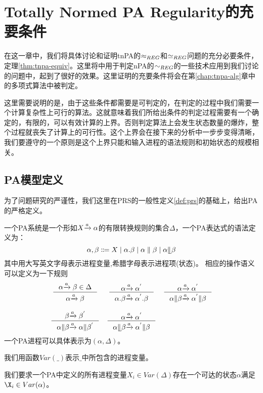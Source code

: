 \chapter{Totally Normed PA Regularity的充要条件}
\label{chap:tnpa-equiv}

在这一章中，我们将具体讨论和证明tnPA的$\approx_{REG}$和$\simeq_{REG}$问题的充分必要条件，定理\ref{thm:tnpa-equiv}。这里将\cite{Kucera1996}中用于判定nPA的$\sim_{REG}$的一些技术应用到我们讨论的问题中，起到了很好的效果。这里证明的充要条件将会在第\ref{chap:tnpa-alg}章中的多项式算法中被判定。

这里需要说明的是，由于这些条件都需要是可判定的，在判定的过程中我们需要一个计算复杂性上可行的算法。这就意味着我们所给出条件的判定过程需要有一个确定的，有限的，可以有效计算的上界。否则判定算法上会发生状态数量的爆炸，整个过程就丧失了计算上的可行性。这个上界会在接下来的分析中一步步变得清晰，我们要遵守的一个原则是这个上界只能和输入进程的语法规则和初始状态的规模相关。

\section{PA模型定义}
\label{sec:pa-def}

为了问题研究的严谨性，我们这里在PRS的一般性定义\ref{def:prs}的基础上，给出PA的严格定义。

\begin{defn}[PA 定义]\label{def:pa}
一个PA系统是一个形如$X{\xrightarrow{a}{}}\alpha$的有限转换规则的集合$\Delta$，一个PA表达式的语法定义为：
$$\alpha,\beta\Coloneqq X\mid \alpha.\beta\mid\alpha\parallel\beta\mid\alpha\llfloor\beta$$
其中用大写英文字母表示进程变量,希腊字母表示进程项(状态)。
相应的操作语义可以定义为一下规则
\[\begin{array}{ccc}
$\inference{\alpha\act{a}\beta\in\Delta}{\alpha\act{a}\beta}$ &
$\inference{\alpha\act{a}\alpha^{'}}{\alpha.\beta\act{a}\alpha^{'}.\beta}$ &
$\inference{\alpha\act{a}\alpha^{'}}{\alpha\| \beta\act{a}\alpha^{'}\|\beta}$ \\
 \\
$\inference{\beta\act{a}\beta^{'}}{\alpha\| \beta\act{a}\alpha \| \beta^{'}}$ &
$\inference{\alpha\act{a}\alpha^{'}}{\alpha\llfloor \beta\act{a}\alpha^{'}\|\beta}$ &
\end{array}\]
一个PA进程可以具体表示为$(\alpha,\Delta)$。
\end{defn}

我们用函数$Var(\_)$表示$\_$中所包含的进程变量。

我们要求一个PA中定义的所有进程变量$X_i\in Var(\Delta)$存在一个可达的状态$\alpha$满足$\X_i\in Var(\alpha)$。

